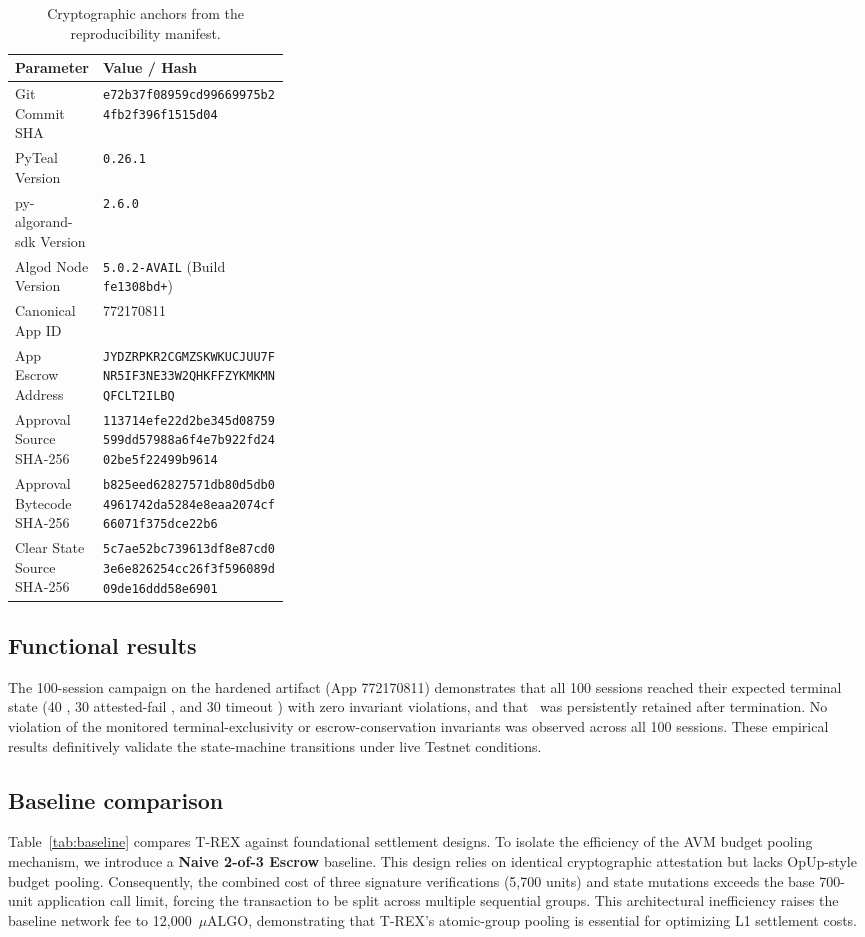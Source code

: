 \documentclass[fleqn,10pt,lineno]{wlpeerj}
\newcommand{\Spent}{\mathsf{SPENT}}
\newcommand{\Released}{\mathsf{Released}}
\newcommand{\Refunded}{\mathsf{Refunded}}
\newcommand{\ualgo}{\ensuremath{\mu\mathrm{ALGO}}\xspace} %
\begin{document}
\begin{table}[htbp]
\centering
\small
\caption{Cryptographic anchors from the reproducibility manifest.}
\label{tab:manifest}
\begin{tabularx}{\linewidth}{@{}p{0.32\linewidth}Y@{}}
\toprule
\textbf{Parameter} & \textbf{Value / Hash} \\
\midrule
Git Commit SHA & \texttt{e72b37f08959cd99669975b24fb2f396f1515d04} \\
PyTeal Version & \texttt{0.26.1} \\
py-algorand-sdk Version & \texttt{2.6.0} \\
Algod Node Version & \texttt{5.0.2-AVAIL} (Build \texttt{fe1308bd+}) \\
Canonical App ID & 772170811 \\
App Escrow Address & \texttt{JYDZRPKR2CGMZSKWKUCJUU7FNR5IF3NE33W2QHKFFZYKMKMNQFCLT2ILBQ} \\
Approval Source SHA-256 & \texttt{113714efe22d2be345d08759599dd57988a6f4e7b922fd2402be5f22499b9614} \\
Approval Bytecode SHA-256 & \texttt{b825eed62827571db80d5db04961742da5284e8eaa2074cf66071f375dce22b6} \\
Clear State Source SHA-256 & \texttt{5c7ae52bc739613df8e87cd03e6e826254cc26f3f596089d09de16ddd58e6901} \\
\bottomrule
\end{tabularx}
\end{table}

\subsection{Functional results}

The 100-session campaign on the hardened artifact (App 772170811) demonstrates that all 100 sessions reached their expected terminal state (40 \Released, 30 attested-fail \Refunded, and 30 timeout \Refunded) with zero invariant violations, and that \Spent\ was persistently retained after termination. No violation of the monitored terminal-exclusivity or escrow-conservation invariants was observed across all 100 sessions. These empirical results definitively validate the state-machine transitions under live Testnet conditions.

\subsection{Baseline comparison}

Table~\ref{tab:baseline} compares T-REX against foundational settlement designs. To isolate the efficiency of the AVM budget pooling mechanism, we introduce a \textbf{Naive 2-of-3 Escrow} baseline. This design relies on identical cryptographic attestation but lacks OpUp-style budget pooling. Consequently, the combined cost of three signature verifications (5,700 units) and state mutations exceeds the base 700-unit application call limit, forcing the transaction to be split across multiple sequential groups. This architectural inefficiency raises the baseline network fee to 12,000~\ualgo, demonstrating that T-REX's atomic-group pooling is essential for optimizing L1 settlement costs.
\end{document}
